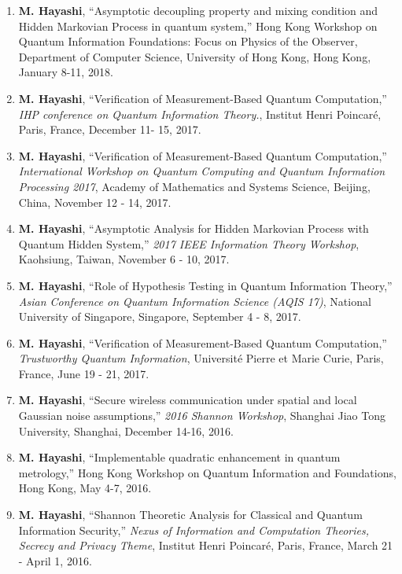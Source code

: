 \documentclass[a4paper,12pt,oneside]{article}
\begin{document}
\begin{enumerate}
\item 
\textbf{M. Hayashi}, ``Asymptotic decoupling property and mixing condition 
and Hidden Markovian Process in quantum system,'' 
Hong Kong Workshop on Quantum Information Foundations:
Focus on Physics of the Observer, 
Department of Computer Science, University of Hong Kong, 
Hong Kong, January 8-11, 2018.

\item 
\textbf{M. Hayashi}, ``Verification of Measurement-Based Quantum Computation,'' 
{\em IHP conference on Quantum Information Theory.}, 
Institut Henri Poincar\'{e},
Paris, France, December 11- 15, 2017.

\item 
\textbf{M. Hayashi}, ``Verification of Measurement-Based Quantum Computation,'' 
{\em International Workshop on Quantum Computing and Quantum Information Processing 2017}, 
Academy of Mathematics and Systems Science, Beijing, China, November 12 - 14, 2017.

\item 
\textbf{M. Hayashi}, ``Asymptotic Analysis for Hidden Markovian Process with Quantum Hidden System,'' 
{\em 2017 IEEE Information Theory Workshop}, 
Kaohsiung, Taiwan, November 6 - 10, 2017.

\item 
\textbf{M. Hayashi}, ``Role of Hypothesis Testing in Quantum Information Theory,'' 
{\em Asian Conference on Quantum Information Science (AQIS 17)}, 
National University of Singapore, Singapore, September 4 - 8, 2017.


\item 
\textbf{M. Hayashi}, ``Verification of Measurement-Based Quantum Computation,'' 
{\em Trustworthy Quantum Information}, 
Universit\'{e} Pierre et Marie Curie, Paris, France, June 19 - 21, 2017.

\item 
\textbf{M. Hayashi}, 
``Secure wireless communication under spatial and local Gaussian noise assumptions,'' 
{\em 2016 Shannon Workshop}, Shanghai Jiao Tong University, Shanghai, December 14-16, 2016.


\item 
\textbf{M. Hayashi}, ``Implementable quadratic enhancement in quantum metrology,'' 
Hong Kong Workshop on Quantum Information and Foundations, Hong Kong, May 4-7, 2016.


\item 
\textbf{M. Hayashi}, ``Shannon Theoretic Analysis for Classical and Quantum Information Security,'' 
{\em Nexus of Information and Computation Theories, Secrecy and Privacy Theme}, 
Institut Henri Poincar\'{e}, Paris, France, March 21 - April 1, 2016.




\end{enumerate}
\end{document}
